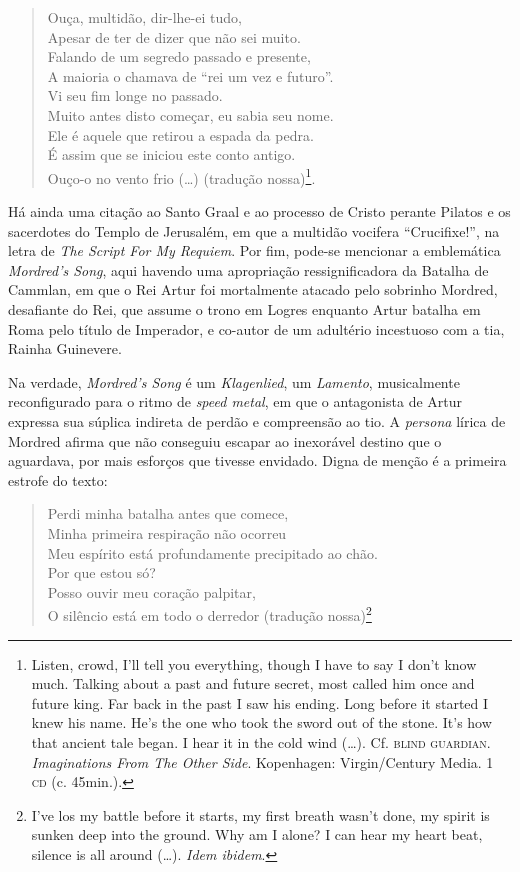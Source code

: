 \begin{quote}
Ouça, multidão, dir-lhe-ei tudo,\\
Apesar de ter de dizer que não sei muito.\\
Falando de um segredo passado e presente,\\
A maioria o chamava de “rei um vez e futuro”.\\
Vi seu fim longe no passado.\\
Muito antes disto começar, eu sabia seu nome.\\
Ele é aquele que retirou a espada da pedra.\\
É assim que se iniciou este conto antigo.\\
Ouço-o no vento frio (\ldots{}) (tradução nossa)\footnote{ Listen, crowd,
I’ll tell you everything, though I have to say I don’t know much.
Talking about a past and future secret, most called him once and future
king. Far back in the past I saw his ending. Long before it started I
knew his name. He’s the one who took the sword out of the stone. It’s
how that ancient tale began. I hear it in the cold wind (\ldots{}). Cf.
\textsc{blind guardian}. \textit{Imaginations From The Other Side}. Kopenhagen:
Virgin/Century Media. 1 \textsc{cd} (c. 45min.).}.
\end{quote}

Há ainda uma citação ao Santo Graal e ao processo de Cristo perante
Pilatos e os sacerdotes do Templo de Jerusalém, em que a multidão
vocifera “Crucifixe!”, na letra de \textit{The Script For My Requiem}.
Por fim, pode-se mencionar a emblemática \textit{Mordred’s Song}, aqui
havendo uma apropriação ressignificadora da Batalha de Cammlan, em que
o Rei Artur foi mortalmente atacado pelo sobrinho Mordred, desafiante
do Rei, que assume o trono em Logres enquanto Artur batalha em Roma
pelo título de Imperador, e co-autor de um adultério incestuoso com a
tia, Rainha Guinevere. 

Na verdade, \textit{Mordred’s Song} é um \textit{Klagenlied}, um
\textit{Lamento}, musicalmente reconfigurado para o ritmo de
\textit{speed metal}, em que o antagonista de Artur expressa sua
súplica indireta de perdão e compreensão ao tio. A \textit{persona}
lírica de Mordred afirma que não conseguiu escapar ao inexorável
destino que o aguardava, por mais esforços que tivesse envidado. Digna
de menção é a primeira estrofe do texto:

\begin{quote}
Perdi minha batalha antes que comece,\\
Minha primeira respiração não ocorreu\\
Meu espírito está profundamente precipitado ao chão.\\
Por que estou só?\\
Posso ouvir meu coração palpitar,\\
O silêncio está em todo o derredor (tradução nossa)\footnote{ I’ve los
my battle before it starts, my first breath wasn’t done, my spirit is
sunken deep into the ground. Why am I alone? I can hear my heart beat,
silence is all around (\ldots{}).  \textit{Idem ibidem}.} 
\end{quote}

